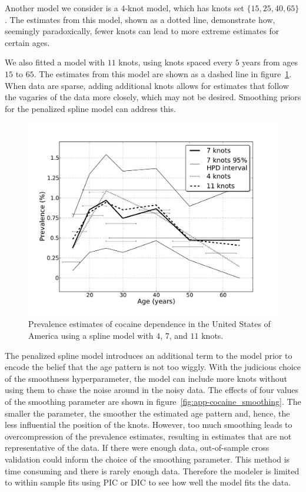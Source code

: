 Another model we consider is a $4$-knot model, which has knots  set $\{15, 25,
40, 65\}$.  The estimates from this model, shown as a dotted line,
demonstrate how, seemingly paradoxically, fewer knots can lead to more
extreme estimates for certain ages.

We also fitted a model with $11$ knots, using knots spaced every $5$ years from
ages $15$ to $65$.
The estimates from this model are shown as a dashed line in
figure~\ref{fig:app-cocaine_knots}.  When data are sparse, adding
additional knots allows for estimates that follow the vagaries of the
data more closely, which may not be desired.  Smoothing priors for the
penalized spline model can address this.

    \begin{figure}[h]
        \begin{center}
            \includegraphics[width=\textwidth]{applications/cocaine_dependence-knots.pdf}
            \caption[Prevalence estimates of cocaine dependence using spline
            models with varying numbers of knots.]{Prevalence estimates of cocaine dependence in the United States of America using a spline model with $4$, $7$, and $11$ knots. }
            \label{fig:app-cocaine_knots}
        \end{center}
    \end{figure}

The penalized spline model introduces an additional term to the model
prior to encode the belief that the age pattern is not too wiggly.
With the judicious choice of the smoothness hyperparameter, the model
can include more knots without using them to chase the noise around in
the noisy data.  The effects of four values of the smoothing parameter
are shown in figure~\ref{fig:app-cocaine_smoothing}.  The smaller the
parameter, the smoother the estimated age pattern and, hence, the less
influential the position of the knots.  However, too much smoothing
leads to overcompression of the prevalence estimates, resulting in estimates
that are not representative of the data.  If there were enough data, 
out-of-sample cross validation could inform the choice of the smoothing 
parameter.  This method is time consuming and there is rarely 
enough data.  Therefore the modeler is limited to within sample fits
using PIC or DIC to see how well the model fits the data.

